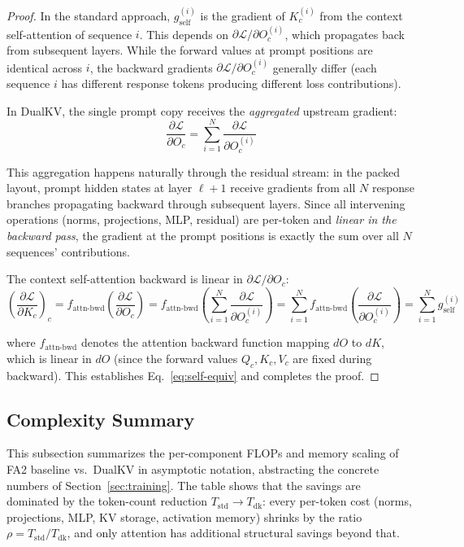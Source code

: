 \documentclass{article}
\begin{document}
\begin{proof}
In the standard approach, $g_{\text{self}}^{(i)}$ is the gradient of $K_c^{(i)}$ from the context self-attention of sequence $i$. This depends on $\partial \mathcal{L}/\partial O_c^{(i)}$, which propagates back from subsequent layers. While the forward values at prompt positions are identical across $i$, the backward gradients $\partial \mathcal{L}/\partial O_c^{(i)}$ generally differ (each sequence $i$ has different response tokens producing different loss contributions).

In DualKV, the single prompt copy receives the \emph{aggregated} upstream gradient:
\begin{equation}
  \frac{\partial \mathcal{L}}{\partial O_c} = \sum_{i=1}^{N} \frac{\partial \mathcal{L}}{\partial O_c^{(i)}}
\end{equation}

This aggregation happens naturally through the residual stream: in the packed layout, prompt hidden states at layer $\ell{+}1$ receive gradients from all $N$ response branches propagating backward through subsequent layers. Since all intervening operations (norms, projections, MLP, residual) are per-token and \emph{linear in the backward pass}, the gradient at the prompt positions is exactly the sum over all $N$ sequences' contributions.

The context self-attention backward is linear in $\partial \mathcal{L}/\partial O_c$:
\begin{equation}
  \left(\frac{\partial \mathcal{L}}{\partial K_c}\right)_{\!c} = f_{\text{attn-bwd}}\!\left(\frac{\partial \mathcal{L}}{\partial O_c}\right) = f_{\text{attn-bwd}}\!\left(\sum_{i=1}^{N} \frac{\partial \mathcal{L}}{\partial O_c^{(i)}}\right) = \sum_{i=1}^{N} f_{\text{attn-bwd}}\!\left(\frac{\partial \mathcal{L}}{\partial O_c^{(i)}}\right) = \sum_{i=1}^{N} g_{\text{self}}^{(i)}
\end{equation}

where $f_{\text{attn-bwd}}$ denotes the attention backward function mapping $dO$ to $dK$, which is linear in $dO$ (since the forward values $Q_c, K_c, V_c$ are fixed during backward). This establishes Eq.~\ref{eq:self-equiv} and completes the proof.
\end{proof}

\subsection{Complexity Summary}

This subsection summarizes the per-component FLOPs and memory scaling of FA2 baseline vs.\ DualKV in asymptotic notation, abstracting the concrete numbers of Section~\ref{sec:training}. The table shows that the savings are dominated by the token-count reduction $T_{\text{std}} \to T_{\text{dk}}$: every per-token cost (norms, projections, MLP, KV storage, activation memory) shrinks by the ratio $\rho = T_{\text{std}}/T_{\text{dk}}$, and only attention has additional structural savings beyond that.
\end{document}

